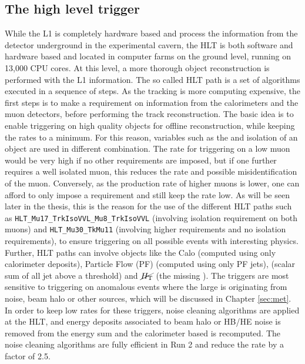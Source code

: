 \subsection*{The high level trigger}
\noindent\justify
While the L1 is completely hardware based and process the information from the detector underground in the experimental cavern, the HLT is both software and hardware based and located in computer farms on the ground level, running on 13,000 CPU cores. 
At this level, a more thorough object reconstruction is performed with the L1 information. The so called HLT path is a set of algorithms executed in a sequence of steps. 
As the tracking is more computing expensive, the first steps is to make a requirement on information from the calorimeters and the muon detectors, before performing the track reconstruction. 
\newpara
\noindent\justify
The basic idea is to enable triggering on high quality objects for offline reconstruction, while keeping the rates to a minimum. 
For this reason, variables such as the \pt and isolation of an object are used in different combination. 
The rate for triggering on a low \pt muon would be very high if no other requirements are imposed, but if one further requires a well isolated muon, this reduces the rate and possible misidentification of the muon. 
Conversely, as the production rate of higher \pt muons is lower, one can afford to only impose a \pt requirement and still keep the rate low.   
As will be seen later in the thesis, this is the reason for the use of the different HLT paths such as \texttt{HLT\_Mu17\_TrkIsoVVL\_Mu8\_TrkIsoVVL} (involving isolation requirement on both muons) and \texttt{HLT\_Mu30\_TkMu11} (involving higher \pt requirements and no isolation requirements), to ensure triggering on all possible events with interesting physics.
\newpara
\noindent\justify
Further, HLT paths can involve objects like the Calo \ptmiss (computed using only calorimeter deposits), Particle Flow (PF) \ptmiss (computed using only PF jets), \HT (scalar sum of all jet \pt above a threshold) and $\cancel{H_{\mathrm{T}}}$ (the missing \HT). 
The \ptmiss triggers are most sensitive to triggering on anomalous events where the large \ptmiss is originating from noise, beam halo or other sources, which will be discussed in Chapter \ref{sec:met}. 
In order to keep low rates for these triggers, noise cleaning algorithms are applied at the HLT, and energy deposits associated to beam halo or HB/HE noise is removed from the energy sum and the calorimeter based \ptmiss is recomputed. 
The noise cleaning algorithms are fully efficient in Run 2 and reduce the rate by a factor of 2.5. 
